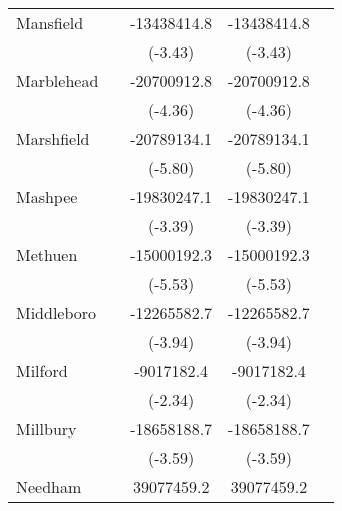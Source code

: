 {\begin{tabular}{l*{4}{c}}
\addlinespace
Mansfield           &                     & -13438414.8\sym{***}& -13438414.8\sym{***}&                     \\
                    &                     &     (-3.43)         &     (-3.43)         &                     \\
\addlinespace
Marblehead          &                     & -20700912.8\sym{***}& -20700912.8\sym{***}&                     \\
                    &                     &     (-4.36)         &     (-4.36)         &                     \\
\addlinespace
Marshfield          &                     & -20789134.1\sym{***}& -20789134.1\sym{***}&                     \\
                    &                     &     (-5.80)         &     (-5.80)         &                     \\
\addlinespace
Mashpee             &                     & -19830247.1\sym{***}& -19830247.1\sym{***}&                     \\
                    &                     &     (-3.39)         &     (-3.39)         &                     \\
\addlinespace
Methuen             &                     & -15000192.3\sym{***}& -15000192.3\sym{***}&                     \\
                    &                     &     (-5.53)         &     (-5.53)         &                     \\
\addlinespace
Middleboro          &                     & -12265582.7\sym{***}& -12265582.7\sym{***}&                     \\
                    &                     &     (-3.94)         &     (-3.94)         &                     \\
\addlinespace
Milford             &                     &  -9017182.4\sym{*}  &  -9017182.4\sym{*}  &                     \\
                    &                     &     (-2.34)         &     (-2.34)         &                     \\
\addlinespace
Millbury            &                     & -18658188.7\sym{***}& -18658188.7\sym{***}&                     \\
                    &                     &     (-3.59)         &     (-3.59)         &                     \\
\addlinespace
Needham             &                     &  39077459.2\sym{***}&  39077459.2\sym{***}&                     \\

\end{tabular}}
